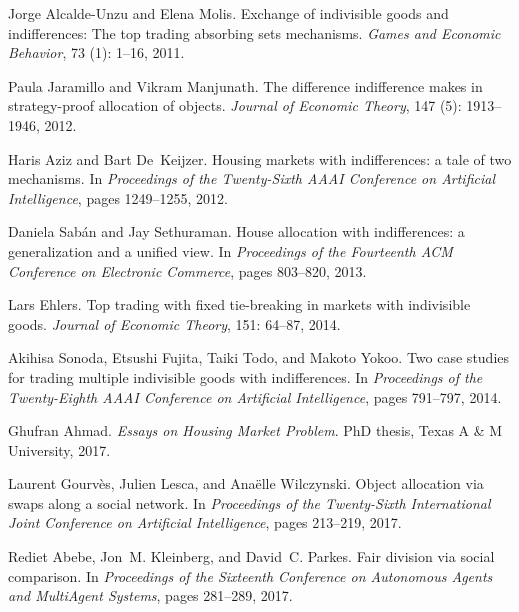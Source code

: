 \begin{thebibliography}{27}
Jorge Alcalde-Unzu and Elena Molis.
\newblock Exchange of indivisible goods and indifferences: The top trading
  absorbing sets mechanisms.
\newblock \emph{Games and Economic Behavior}, 73 (1): 1--16,
  2011.

Paula Jaramillo and Vikram Manjunath.
\newblock The difference indifference makes in strategy-proof allocation of
  objects.
\newblock \emph{Journal of Economic Theory}, 147 (5):
  1913--1946, 2012.

Haris Aziz and Bart De~Keijzer.
\newblock Housing markets with indifferences: a tale of two mechanisms.
\newblock In \emph{Proceedings of the Twenty-Sixth AAAI Conference on
  Artificial Intelligence}, pages 1249--1255, 2012.

Daniela Sab{\'{a}}n and Jay Sethuraman.
\newblock House allocation with indifferences: a generalization and a unified
  view.
\newblock In \emph{Proceedings of the Fourteenth {ACM} Conference on Electronic
  Commerce}, pages 803--820, 2013.

Lars Ehlers.
\newblock Top trading with fixed tie-breaking in markets with indivisible
  goods.
\newblock \emph{Journal of Economic Theory}, 151: 64--87, 2014.

Akihisa Sonoda, Etsushi Fujita, Taiki Todo, and Makoto Yokoo.
\newblock Two case studies for trading multiple indivisible goods with
  indifferences.
\newblock In \emph{Proceedings of the Twenty-Eighth AAAI Conference on
  Artificial Intelligence}, pages 791--797, 2014.

Ghufran Ahmad.
\newblock \emph{Essays on Housing Market Problem}.
\newblock PhD thesis, Texas A \& M University, 2017.

Laurent Gourv{\`e}s, Julien Lesca, and Ana{\"e}lle Wilczynski.
\newblock Object allocation via swaps along a social network.
\newblock In \emph{Proceedings of the Twenty-Sixth International Joint
  Conference on Artificial Intelligence}, pages 213--219, 2017.

Rediet Abebe, Jon~M. Kleinberg, and David~C. Parkes.
\newblock Fair division via social comparison.
\newblock In \emph{Proceedings of the Sixteenth Conference on Autonomous Agents
  and MultiAgent Systems}, pages 281--289, 2017.


\end{thebibliography}
